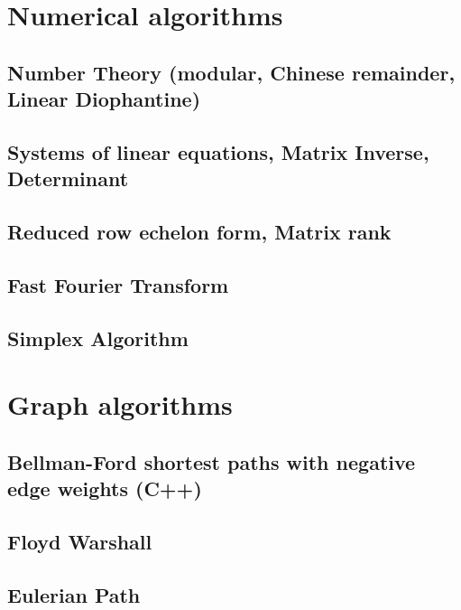 \section{Numerical algorithms}
\subsection{Number Theory (modular, Chinese remainder, Linear Diophantine)}
\raggedbottom
\hrulefill
\subsection{Systems of linear equations, Matrix Inverse, Determinant}
\raggedbottom
\hrulefill
\subsection{Reduced row echelon form, Matrix rank}
\raggedbottom
\hrulefill
\subsection{Fast Fourier Transform}
\raggedbottom
\hrulefill
\subsection{Simplex Algorithm}
\raggedbottom
\hrulefill

\section{Graph algorithms}
\subsection{Bellman-Ford shortest paths with negative edge weights (C++)}
\raggedbottom
\hrulefill
\subsection{Floyd Warshall}
\raggedbottom
\hrulefill
\subsection{Eulerian Path}
\raggedbottom
\hrulefill
